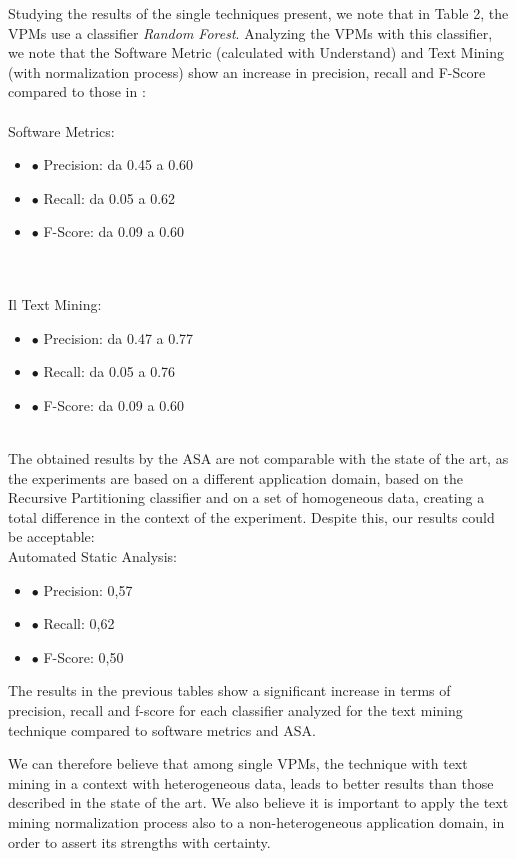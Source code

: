 \documentclass[twocolumn,10pt]{asme2ej}
\begin{document}
Studying the results of the single techniques present, we note that in Table 2, the VPMs use a classifier \textit {Random Forest}. Analyzing the VPMs with this classifier, we note that the Software Metric (calculated with Understand) and Text Mining (with normalization process) show an increase in precision, recall and F-Score compared to those in \cite{Theisen}: \\
\\Software Metrics:
\begin{itemize}
    \item $\bullet$ Precision: da 0.45 a 0.60
    \item $\bullet$ Recall: da 0.05 a 0.62
    \item $\bullet$ F-Score: da 0.09 a 0.60
\end{itemize}\\
\\Il Text Mining:
\begin{itemize}
    \item $\bullet$ Precision: da 0.47 a 0.77
    \item $\bullet$ Recall: da 0.05 a 0.76
    \item $\bullet$ F-Score: da 0.09 a 0.60
\end{itemize}
\\
The obtained results by the ASA are not comparable with the state of the art, as the experiments are based on a different application domain, based on the Recursive Partitioning classifier and on a set of homogeneous data, creating a total difference in the context of the experiment.
Despite this, our results could be acceptable:
\\Automated Static Analysis:
\begin{itemize}
    \item $\bullet$ Precision: 0,57
    \item $\bullet$ Recall: 0,62
    \item $\bullet$ F-Score: 0,50
\end{itemize}


The results in the previous tables show a significant increase in terms of precision, recall and f-score for each classifier analyzed for the text mining technique compared to software metrics and ASA.

We can therefore believe that among single VPMs, the technique with text mining in a context with heterogeneous data, leads to better results than those described in the state of the art.
We also believe it is important to apply the text mining normalization process also to a non-heterogeneous application domain, in order to assert its strengths with certainty.
\end{document}
